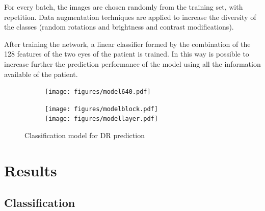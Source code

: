 \documentclass[preprint]{elsarticle}
\theoremstyle{definition} %
\theoremstyle{remark}
\begin{document}
For every batch, the images are chosen randomly from the training set, with repetition. Data augmentation techniques are applied to increase the diversity of the classes (random rotations and brightness and contrast modifications). 

After training the network, a linear classifier formed by the combination of the 128 features of the two eyes of the patient is trained. In this way is possible to increase further the prediction performance of the model using all the information available of the patient.

\begin{figure}[h!]
	\begin{subfigure}[b]{.30\textwidth}
		\centering
		\texttt{[image: figures/model640.pdf]}
	\end{subfigure}
	\hfill    
	\begin{subfigure}[b]{.30\textwidth}
		\centering
		\texttt{[image: figures/modelblock.pdf]}\\
		\vspace{2cm}
		\texttt{[image: figures/modellayer.pdf]}\\
		\vspace{2cm}
	\end{subfigure}
	\hfill 
	\caption{Classification model for DR prediction}  
	\label{fig:drmodel} 
\end{figure}

\section{Results}\label{sec:results}

\subsection{Classification}
\end{document}
